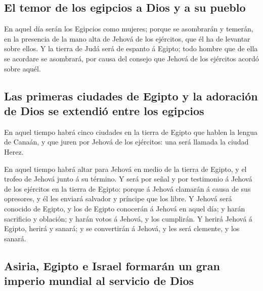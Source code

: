 \hypertarget{el-temor-de-los-egipcios-a-dios-y-a-su-pueblo}{%
\subsection{El temor de los egipcios a Dios y a su
pueblo}\label{el-temor-de-los-egipcios-a-dios-y-a-su-pueblo}}

 En aquel día serán los Egipcios como mujeres; porque se
asombrarán y temerán, en la presencia de la mano alta de Jehová de los
ejércitos, que él ha de levantar sobre ellos.  Y la tierra
de Judá será de espanto á Egipto; todo hombre que de ella se acordare se
asombrará, por causa del consejo que Jehová de los ejércitos acordó
sobre aquél.

\hypertarget{las-primeras-ciudades-de-egipto-y-la-adoraciuxf3n-de-dios-se-extendiuxf3-entre-los-egipcios}{%
\subsection{Las primeras ciudades de Egipto y la adoración de Dios se
extendió entre los
egipcios}\label{las-primeras-ciudades-de-egipto-y-la-adoraciuxf3n-de-dios-se-extendiuxf3-entre-los-egipcios}}

 En aquel tiempo habrá cinco ciudades en la tierra de
Egipto que hablen la lengua de Canaán, y que juren por Jehová de los
ejércitos: una será llamada la ciudad Herez.

 En aquel tiempo habrá altar para Jehová en medio de la
tierra de Egipto, y el trofeo de Jehová junto á su término.
 Y será por señal y por testimonio á Jehová de los
ejércitos en la tierra de Egipto: porque á Jehová clamarán á causa de
sus opresores, y él les enviará salvador y príncipe que los libre.
 Y Jehová será conocido de Egipto, y los de Egipto
conocerán á Jehová en aquel día; y harán sacrificio y oblación; y harán
votos á Jehová, y los cumplirán.  Y herirá Jehová á Egipto,
herirá y sanará; y se convertirán á Jehová, y les será clemente, y los
sanará.

\hypertarget{asiria-egipto-e-israel-formaruxe1n-un-gran-imperio-mundial-al-servicio-de-dios}{%
\subsection{Asiria, Egipto e Israel formarán un gran imperio mundial al
servicio de
Dios}\label{asiria-egipto-e-israel-formaruxe1n-un-gran-imperio-mundial-al-servicio-de-dios}}

